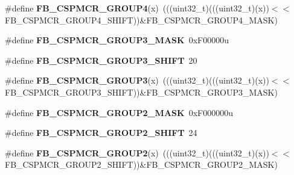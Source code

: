 \begin{DoxyCompactItemize}
\item 
\#define {\bfseries F\+B\+\_\+\+C\+S\+P\+M\+C\+R\+\_\+\+G\+R\+O\+U\+P4}(x)~(((uint32\+\_\+t)(((uint32\+\_\+t)(x))$<$$<$F\+B\+\_\+\+C\+S\+P\+M\+C\+R\+\_\+\+G\+R\+O\+U\+P4\+\_\+\+S\+H\+I\+FT))\&F\+B\+\_\+\+C\+S\+P\+M\+C\+R\+\_\+\+G\+R\+O\+U\+P4\+\_\+\+M\+A\+SK)\hypertarget{group__FB__Register__Masks_ga5bc5cb1164507be89f7cf0324491d5f1}{}\label{group__FB__Register__Masks_ga5bc5cb1164507be89f7cf0324491d5f1}

\item 
\#define {\bfseries F\+B\+\_\+\+C\+S\+P\+M\+C\+R\+\_\+\+G\+R\+O\+U\+P3\+\_\+\+M\+A\+SK}~0x\+F00000u\hypertarget{group__FB__Register__Masks_gac53d0fcbc3464725ceda1d20147fe98c}{}\label{group__FB__Register__Masks_gac53d0fcbc3464725ceda1d20147fe98c}

\item 
\#define {\bfseries F\+B\+\_\+\+C\+S\+P\+M\+C\+R\+\_\+\+G\+R\+O\+U\+P3\+\_\+\+S\+H\+I\+FT}~20\hypertarget{group__FB__Register__Masks_ga9f0b849b6cb1a2f629dcd23a0a0a4306}{}\label{group__FB__Register__Masks_ga9f0b849b6cb1a2f629dcd23a0a0a4306}

\item 
\#define {\bfseries F\+B\+\_\+\+C\+S\+P\+M\+C\+R\+\_\+\+G\+R\+O\+U\+P3}(x)~(((uint32\+\_\+t)(((uint32\+\_\+t)(x))$<$$<$F\+B\+\_\+\+C\+S\+P\+M\+C\+R\+\_\+\+G\+R\+O\+U\+P3\+\_\+\+S\+H\+I\+FT))\&F\+B\+\_\+\+C\+S\+P\+M\+C\+R\+\_\+\+G\+R\+O\+U\+P3\+\_\+\+M\+A\+SK)\hypertarget{group__FB__Register__Masks_ga5f46c89a4298c3b2b367d829487dcb4b}{}\label{group__FB__Register__Masks_ga5f46c89a4298c3b2b367d829487dcb4b}

\item 
\#define {\bfseries F\+B\+\_\+\+C\+S\+P\+M\+C\+R\+\_\+\+G\+R\+O\+U\+P2\+\_\+\+M\+A\+SK}~0x\+F000000u\hypertarget{group__FB__Register__Masks_ga594596b281baba23e03cb37fbf0a05db}{}\label{group__FB__Register__Masks_ga594596b281baba23e03cb37fbf0a05db}

\item 
\#define {\bfseries F\+B\+\_\+\+C\+S\+P\+M\+C\+R\+\_\+\+G\+R\+O\+U\+P2\+\_\+\+S\+H\+I\+FT}~24\hypertarget{group__FB__Register__Masks_ga332a2c4e7103b2f21af54da036518928}{}\label{group__FB__Register__Masks_ga332a2c4e7103b2f21af54da036518928}

\item 
\#define {\bfseries F\+B\+\_\+\+C\+S\+P\+M\+C\+R\+\_\+\+G\+R\+O\+U\+P2}(x)~(((uint32\+\_\+t)(((uint32\+\_\+t)(x))$<$$<$F\+B\+\_\+\+C\+S\+P\+M\+C\+R\+\_\+\+G\+R\+O\+U\+P2\+\_\+\+S\+H\+I\+FT))\&F\+B\+\_\+\+C\+S\+P\+M\+C\+R\+\_\+\+G\+R\+O\+U\+P2\+\_\+\+M\+A\+SK)\hypertarget{group__FB__Register__Masks_ga90ca2c9ade016544de01e8ff18906bdc}{}\label{group__FB__Register__Masks_ga90ca2c9ade016544de01e8ff18906bdc}


\end{DoxyCompactItemize}
